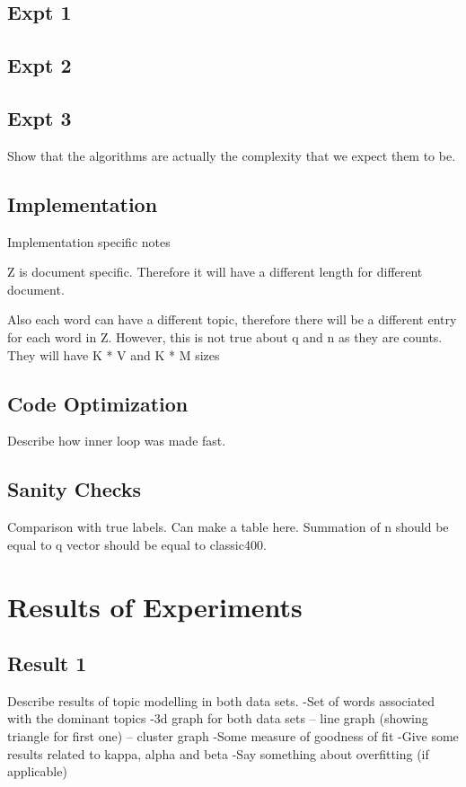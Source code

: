 \documentclass[11pt,a4paper,oneside]{article}
\begin{document}
\subsection{Expt 1}

\subsection{Expt 2}

\subsection{Expt 3}
Show that the algorithms are actually the complexity that we expect them to be.

\subsection{Implementation}
Implementation specific notes

Z is document specific. Therefore it will have a different length for different document.

Also each word can have a different topic, therefore there will be a different entry for each word in Z. However, this is not true about q and n as they are counts. They will have K * V and K * M sizes

\subsection{Code Optimization}
Describe how inner loop was made fast.

\subsection{Sanity Checks}
Comparison with true labels. 
Can make a table here.
Summation of n should be equal to q vector should be equal to classic400.

\section{Results of Experiments}
\label{sec:Results}

\subsection{Result 1}
Describe results of topic modelling in both data sets.
-Set of words associated with the dominant topics
-3d graph for both data sets 
	-- line graph (showing triangle for first one)
	-- cluster graph
-Some measure of goodness of fit
-Give some results related to kappa, alpha and beta
-Say something about overfitting (if applicable)
\end{document}
